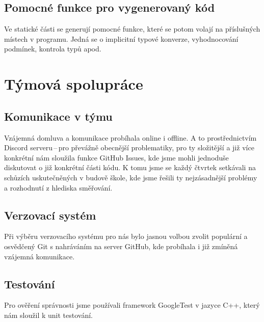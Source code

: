 \documentclass[a4paper, 12pt]{article}
\begin{document}
    \subsection{Pomocné funkce pro vygenerovaný kód} \label{pomocne}
    Ve statické části se generují pomocné funkce, které se potom volají na příslušných místech v programu. Jedná se o implicitní typové konverze, vyhodnocování podmínek, kontrola typů apod.

    \section{Týmová spolupráce}
    \subsection{Komunikace v týmu}
        Vzájemná domluva a komunikace probíhala online i offline. A to prostřednictvím Discord serveru\,--\,pro převážně obecnější problematiky, pro ty složitější a již více konkrétní nám sloužila funkce GitHub Issues, kde jsme mohli jednoduše diskutovat o již konkrétní části kódu. K tomu jsme se každý čtvrtek setkávali na schůzích uskutečněných v budově škole, kde jsme řešili ty nejzásadnější problémy a rozhodnutí z hlediska směřování.
    \subsection{Verzovací systém}
        Při výběru verzovacího systému pro nás bylo jasnou volbou zvolit populární a osvědčený Git s nahráváním na server GitHub, kde probíhala i již zmíněná vzájemná komunikace.
    \subsection{Testování}
        Pro ověření správnosti jsme používali framework GoogleTest v jazyce C++, který nám sloužil k unit testování.
\end{document}
